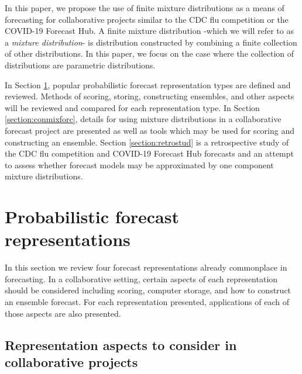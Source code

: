 \documentclass[11pt,notitlepage]{isuthesis}
\begin{document}
In this paper, we propose the use of finite mixture distributions as a means 
of forecasting for collaborative projects similar to the CDC flu competition or 
the COVID-19
Forecast Hub. A finite mixture distribution -which we will refer to as a
\emph{mixture distribution}- is distribution constructed by combining a finite 
collection of other distributions. In this paper, we focus on the case where the
collection of distributions are parametric distributions.

In Section \ref{section:representations}, 
popular probabilistic forecast representation 
types are defined and reviewed. Methods of scoring, storing, constructing 
ensembles, and other aspects will be reviewed and compared for each 
representation type.
In Section \ref{section:conmixforc}, details for using mixture 
distributions in a collaborative forecast project are presented as well as tools
which may be used for scoring and constructing an ensemble.
Section \ref{section:retrostud} is a retrospective study of the CDC flu 
competition and COVID-19 Forecast Hub
forecasts and an attempt to assess whether forecast models
may be approximated by one component mixture distributions.






















\chapter{Probabilistic forecast representations}
\label{section:representations}

In this section we review four forecast representations already commonplace in 
forecasting. In a collaborative setting, certain aspects of each representation
should be considered including scoring, computer storage, and how to construct
an ensemble forecast. For each representation presented, applications of each of 
those aspects are also presented.


\section{Representation aspects to consider in collaborative projects}
\end{document}
